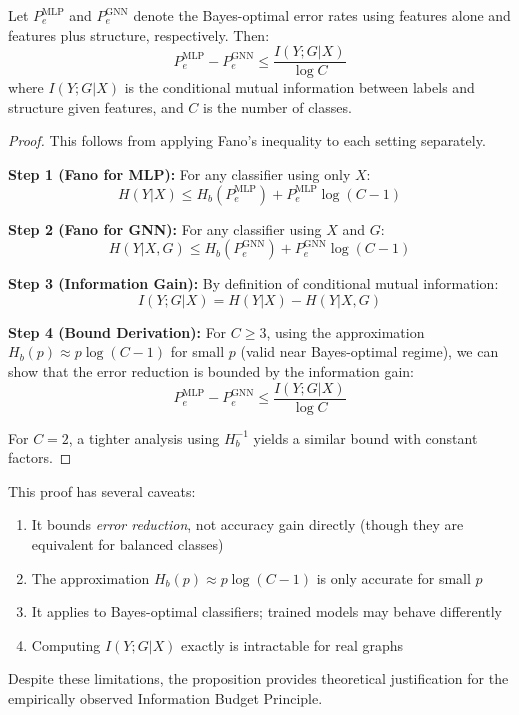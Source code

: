 \begin{proposition}
\label{prop:structure_bound}
Let $P_e^{\text{MLP}}$ and $P_e^{\text{GNN}}$ denote the Bayes-optimal error rates using features alone and features plus structure, respectively. Then:
\begin{equation}
    P_e^{\text{MLP}} - P_e^{\text{GNN}} \leq \frac{I(Y; G | X)}{\log C}
\end{equation}
where $I(Y; G | X)$ is the conditional mutual information between labels and structure given features, and $C$ is the number of classes.
\end{proposition}

\begin{proof}
This follows from applying Fano's inequality to each setting separately.

\textbf{Step 1 (Fano for MLP):} For any classifier using only $X$:
\begin{equation}
    H(Y|X) \leq H_b(P_e^{\text{MLP}}) + P_e^{\text{MLP}} \log(C-1)
\end{equation}

\textbf{Step 2 (Fano for GNN):} For any classifier using $X$ and $G$:
\begin{equation}
    H(Y|X,G) \leq H_b(P_e^{\text{GNN}}) + P_e^{\text{GNN}} \log(C-1)
\end{equation}

\textbf{Step 3 (Information Gain):} By definition of conditional mutual information:
\begin{equation}
    I(Y; G | X) = H(Y|X) - H(Y|X,G)
\end{equation}

\textbf{Step 4 (Bound Derivation):} For $C \geq 3$, using the approximation $H_b(p) \approx p \log(C-1)$ for small $p$ (valid near Bayes-optimal regime), we can show that the error reduction is bounded by the information gain:
\begin{equation}
    P_e^{\text{MLP}} - P_e^{\text{GNN}} \leq \frac{I(Y; G | X)}{\log C}
\end{equation}

For $C = 2$, a tighter analysis using $H_b^{-1}$ yields a similar bound with constant factors.
\end{proof}

\begin{remark}
\label{rem:proof_limitations}
This proof has several caveats:
\begin{enumerate}
    \item It bounds \textit{error reduction}, not accuracy gain directly (though they are equivalent for balanced classes)
    \item The approximation $H_b(p) \approx p \log(C-1)$ is only accurate for small $p$
    \item It applies to Bayes-optimal classifiers; trained models may behave differently
    \item Computing $I(Y; G | X)$ exactly is intractable for real graphs
\end{enumerate}
Despite these limitations, the proposition provides theoretical justification for the empirically observed Information Budget Principle.
\end{remark}

